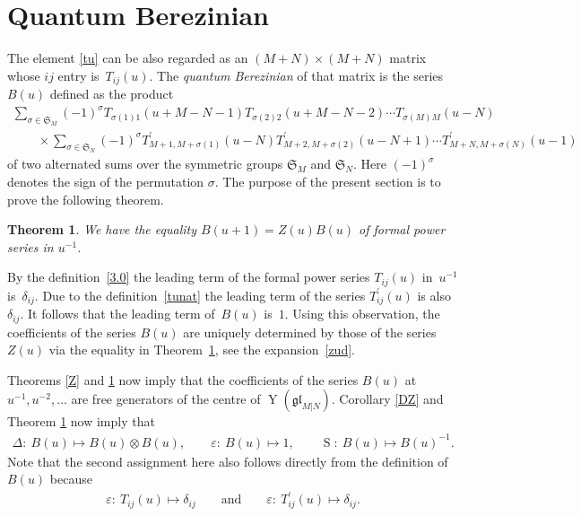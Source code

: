 \documentclass[pdftex]{sigma}
\numberwithin{equation}{section}
\newtheorem{Theorem}{Theorem}[section]
\def\1{^{-1}}
\def\de{\delta}
\def\De{\Delta}
\def\ep{\varepsilon}
\def\glMN{\mathfrak{gl}_{M|N}}
\def\ot{\otimes}
\def\S{\operatorname{S}}
\def\si{\sigma}
\def\Sym{\mathfrak{S}}
\def\TP{T^{\prime}}
\def\YMN{\operatorname{Y}(\glMN)}
\begin{document}
\section{Quantum Berezinian}\label{sec:3}

The element \eqref{tu} can be also regarded as an $(M+N)\times(M+N)$ matrix
whose $ij$ entry is~$T_{ij}(u) $.
The \emph{quantum Berezinian} of that matrix is the series $B(u)$ defined
as the product
\begin{gather*}
 \sum_{\si\in\Sym_M} (-1)^\si T_{\si(1)1}(u+M-N-1) T_{\si(2)2}(u+M-N-2)\cdots T_{\si(M)M}(u-N)
\\
\qquad{}\times \sum_{\si\in\Sym_N} (-1)^\si
\TP_{M+1,M+\si(1)}(u-N)
\TP_{M+2,M+\si(2)}(u-N+1)\cdots
\TP_{M+N,M+\si(N)}(u-1)
\end{gather*}
of two alternated sums over the symmetric groups $\Sym_M$ and $\Sym_N $.
Here $(-1)^\si$ denotes the sign of the permutation $\si $.
The purpose of the present section is to prove the following theorem.

\begin{Theorem}\label{BZ}
We have the equality $B(u+1)=Z(u) B(u)$ of formal power series in $u\1$.
\end{Theorem}

By the definition~\eqref{3.0} the leading term
of the formal power series $T_{ij}(u)$ in~$u\1$ is~$\de_{ij} $.
Due to the definition~\eqref{tunat} the leading term
of the series $\TP_{ij}(u)$ is also $\de_{ij} $.
It follows that the leading term
of~$B(u)$ is~$1 $.
Using this observation, the coefficients of
the series $B(u)$ are uniquely determined by those of the series~$Z(u)$
via the equality in Theorem~\ref{BZ},
see the expansion~\eqref{zud}.

Theorems \ref{Z} and \ref{BZ} now imply
that the coefficients of the series $B(u)$ at $u\1,u^{-2}, \dots$
are free generators of the centre of $\YMN $.
Corollary \ref{DZ} and Theorem \ref{BZ} now imply that
\begin{gather*}
\De\colon \ B(u)\mapsto B(u)\ot B(u) ,
\qquad
\ep\colon \ B(u)\mapsto1 ,
\qquad
\S\colon \ B(u)\mapsto B(u)^{-1} .
\end{gather*}
Note that the second assignment here also follows directly from the definition of $B(u)$
because
\begin{gather*}
\ep\colon \ T_{ij}(u)\mapsto\de_{ij}
\qquad\text{and}\qquad \ep\colon \ \TP_{ij}(u)\mapsto\de_{ij} .
\end{gather*}
\end{document}
